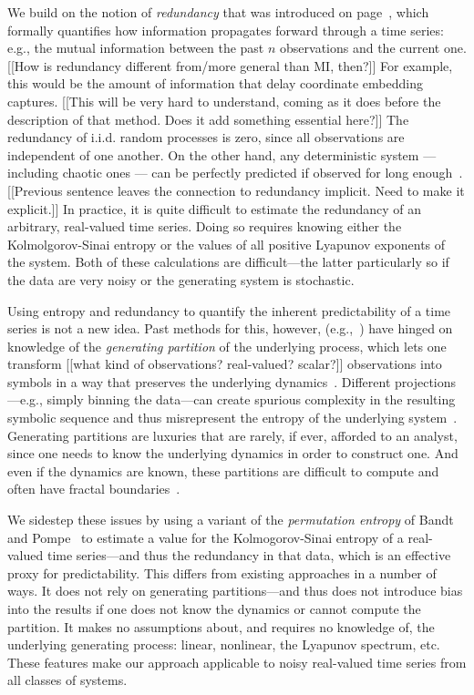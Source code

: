 We build on the notion of \emph{redundancy} that was introduced on
page~\pageref{page:redundancy}, which formally quantifies how
information propagates forward through a time series:
e.g., the mutual information between the past $n$ observations and the
current one.  {\color{red} [[How is redundancy different from/more
      general than MI, then?]]}  For example, this would be the amount
of information that delay coordinate embedding captures.  {\color{red}
  [[This will be very hard to understand, coming as it does before the
      description of that method.  Does it add something essential
      here?]]}  The redundancy of i.i.d. random processes is zero,
since all observations are independent of one another.  On the other
hand, any deterministic system --- including chaotic ones --- can be
perfectly predicted if observed for long enough~\cite{weigend-book}.
{\color{red} [[Previous sentence leaves the connection to redundancy
      implicit.  Need to make it explicit.]]}  
In practice, it is quite difficult to estimate the redundancy of an
arbitrary, real-valued time series.  Doing so requires knowing either
the Kolmolgorov-Sinai entropy or the values of all positive Lyapunov
exponents of the system.  Both of these calculations are
difficult---the latter particularly so if the data are very noisy or
the generating system is stochastic.

Using entropy and redundancy to quantify the inherent predictability
of a time series is not a new idea.  Past methods for this, however,
(e.g.,~\cite{Shannon1951, mantegna1994linguistic}) have hinged on
knowledge of the \emph{generating partition} of the underlying
process, which lets one transform {\color{red}[[what kind of
      observations?  real-valued? scalar?]]}  observations into
symbols in a way that preserves the underlying dynamics~\cite{lind95}.
Different projections---e.g., simply binning the data---can create
spurious complexity in the resulting symbolic sequence and thus
misrepresent the entropy of the underlying system~\cite{bollt2001}.
Generating partitions are luxuries that are rarely, if ever, afforded
to an analyst, since one needs to know the underlying dynamics in
order to construct one.  And even if the dynamics are known, these
partitions are difficult to compute and often have fractal
boundaries~\cite{eisele1999}.

We sidestep these issues by using a variant of the \emph{permutation
  entropy} of Bandt and Pompe~\cite{bandt2002per} to estimate a value
for the Kolmogorov-Sinai entropy of a real-valued time series---and
thus the redundancy in that data, which is an effective proxy for
predictability.  This differs from existing approaches in a number of
ways.  It does not rely on generating partitions---and thus does not
introduce bias into the results if one does not know the dynamics or
cannot compute the partition.  It makes no assumptions about, and
requires no knowledge of, the underlying generating process: linear,
nonlinear, the Lyapunov spectrum, etc.  These features make our
approach applicable to noisy real-valued time series from all classes
of systems.

